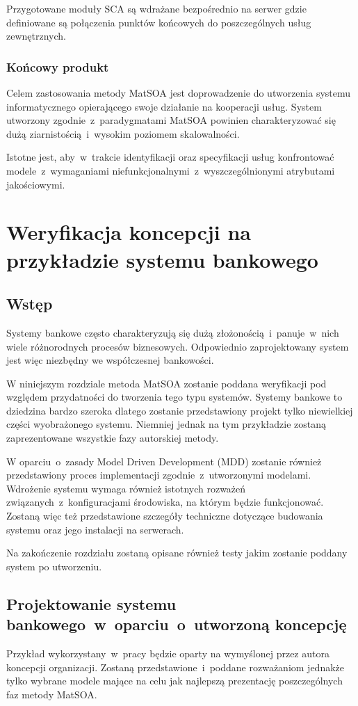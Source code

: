 Przygotowane moduły SCA są wdrażane bezpośrednio na serwer gdzie definiowane są połączenia punktów końcowych do poszczególnych usług zewnętrznych.

\subsection{Końcowy produkt}
Celem zastosowania metody MatSOA jest doprowadzenie do utworzenia systemu informatycznego opierającego swoje działanie na kooperacji usług. System utworzony zgodnie~z~paradygmatami MatSOA powinien charakteryzować się dużą ziarnistością~i~wysokim poziomem skalowalności.

Istotne jest, aby~w~trakcie identyfikacji oraz specyfikacji usług konfrontować modele~z~wymaganiami niefunkcjonalnymi~z~wyszczególnionymi atrybutami jakościowymi.

\chapter{Weryfikacja koncepcji na przykładzie systemu bankowego}
\section{Wstęp}
Systemy bankowe często charakteryzują się dużą złożonością~i~panuje~w~nich wiele różnorodnych procesów biznesowych. Odpowiednio zaprojektowany system jest więc niezbędny we współczesnej bankowości.
 
W niniejszym rozdziale metoda MatSOA zostanie poddana weryfikacji pod względem przydatności do tworzenia tego typu systemów. Systemy bankowe to dziedzina bardzo szeroka dlatego zostanie przedstawiony projekt tylko niewielkiej części wyobrażonego systemu. Niemniej jednak na tym przykładzie zostaną zaprezentowane wszystkie fazy autorskiej metody.

W oparciu~o~zasady Model Driven Development (MDD) zostanie również przedstawiony proces implementacji zgodnie~z~utworzonymi modelami. Wdrożenie systemu wymaga również istotnych rozważeń związanych~z~konfiguracjami środowiska, na którym będzie funkcjonować. Zostaną więc też przedstawione szczegóły techniczne dotyczące budowania systemu oraz jego instalacji na serwerach.

Na zakończenie rozdziału zostaną opisane również testy jakim zostanie poddany system po utworzeniu.

\section{Projektowanie systemu bankowego~w~oparciu~o~utworzoną koncepcję}
Przykład wykorzystany~w~pracy będzie oparty na wymyślonej przez autora koncepcji organizacji. Zostaną przedstawione~i~poddane rozważaniom jednakże tylko wybrane modele mające na celu jak najlepszą prezentację poszczególnych faz metody MatSOA.

